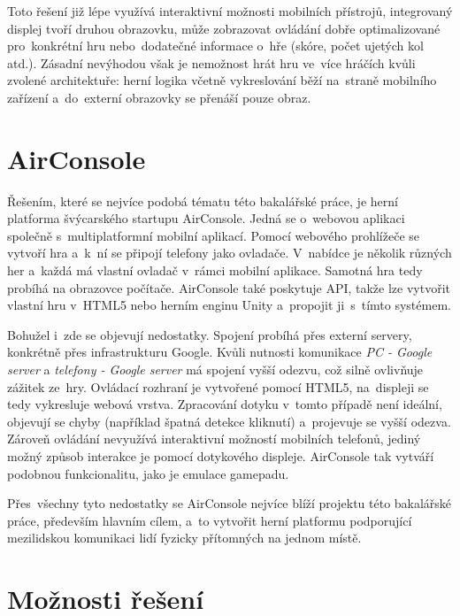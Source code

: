 \documentclass[thesis=B,czech,hidelinks]{FITthesis}[2012/06/26] %
\begin{document}
Toto řešení již lépe využívá interaktivní možnosti mobilních přístrojů, integrovaný displej tvoří druhou obrazovku, může zobrazovat ovládání dobře optimalizované pro~konkrétní hru nebo~dodatečné informace o~hře (skóre, počet ujetých kol atd.). Zásadní nevýhodou však je nemožnost hrát hru ve~více hráčích kvůli zvolené architektuře: herní logika včetně vykreslování běží na~straně mobilního zařízení a~do~externí obrazovky se přenáší pouze obraz.


\section{AirConsole}

Řešením, které se nejvíce podobá tématu této bakalářské práce, je herní platforma švýcarského startupu AirConsole\cite{airconsole}. Jedná se o~webovou aplikaci společně s~multiplatformní mobilní aplikací. Pomocí webového prohlížeče se vytvoří hra a~k~ní se připojí telefony jako ovladače. V~nabídce je několik různých her a~každá má vlastní ovladač v~rámci mobilní aplikace. Samotná hra tedy probíhá na obrazovce počítače. AirConsole také poskytuje API, takže lze vytvořit vlastní hru v~HTML5 nebo herním enginu Unity a~propojit ji~s~tímto systémem.

Bohužel i~zde se objevují nedostatky. Spojení probíhá přes externí servery, konkrétně přes infrastrukturu Google\cite{airconsole}. Kvůli nutnosti komunikace \textit{PC - Google server} a \textit{telefony - Google server} má spojení vyšší odezvu, což silně ovlivňuje zážitek ze~hry. Ovládací rozhraní je vytvořené pomocí HTML5, na~displeji se tedy vykresluje webová vrstva. Zpracování dotyku v~tomto případě není ideální, objevují se chyby (například špatná detekce kliknutí) a~projevuje se vyšší odezva. Zároveň ovládání nevyužívá interaktivní možností mobilních telefonů, jediný možný způsob interakce je pomocí dotykového displeje. AirConsole tak vytváří podobnou funkcionalitu, jako je emulace gamepadu.

Přes~všechny tyto nedostatky se AirConsole nejvíce blíží projektu této bakalářské práce, především hlavním cílem, a~to vytvořit herní platformu podporující mezilidskou komunikaci lidí fyzicky přítomných na jednom místě.


\section{Možnosti řešení}
\end{document}
